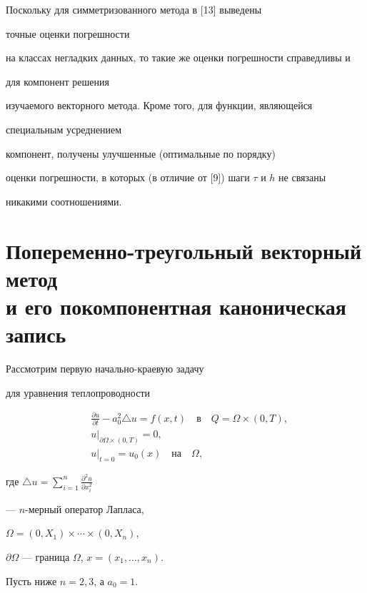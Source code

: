 Поскольку для симметризованного метода в [13] выведены


точные оценки погрешности 


на классах негладких данных, то такие же оценки погрешности справедливы и 


для компонент решения


изучаемого векторного метода. Кроме того, для функции, являющейся 


специальным усреднением


компонент, получены улучшенные (оптимальные по порядку)


оценки погрешности, в которых (в отличие от [9]) шаги $\tau$ и $h$ не связаны


никакими соотношениями.





\section{Попеременно-треугольный векторный метод\protect\\


и его покомпонентная каноническая запись}





Рассмотрим первую начально-краевую задачу 


для уравнения теплопроводности


\begin{align}


&\frac{\partial u}{\partial t}-a^2_0\triangle u=f(x,t)\quad


\text{в}\quad Q=\Omega\times(0,T),\\


&u\big|_{\partial\Omega\times(0,T)}=0,\\


&u\big|_{t=0}=u_0(x)\quad\text{на}\quad \Omega,


\end{align}


где $\triangle u=\sum\limits_{i=1}^n \frac{\partial^2 u}{\partial x_i^2}$


 --- $n$-мерный оператор Лапласа,


$\Omega=(0,X_1)\times\dotsb\times(0,X_n)$,


$\partial\Omega$ --- граница $\Omega$, $x=(x_1,\dotsc,x_n)$.


Пусть ниже $n=2,3$, а $a_0=1$.





